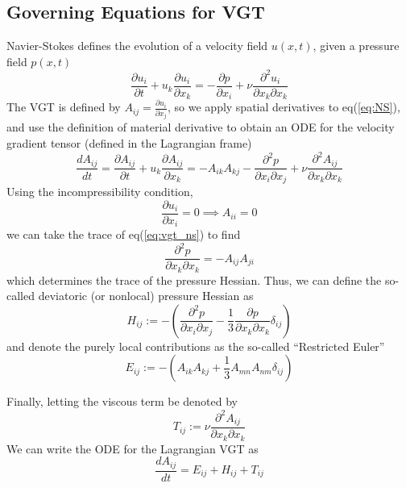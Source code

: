 \subsection{Governing Equations for VGT}
Navier-Stokes defines the evolution of a velocity field $u(x,t)$, given a pressure field $p(x,t)$
    \begin{equation} \label{eq:NS}
      \frac{\partial u_i}{\partial t} + u_k \frac{\partial u_i}{\partial x_k} = -\frac{\partial p}{\partial x_i} + \nu \frac{\partial^2 u_i}{\partial x_k \partial x_k}
    \end{equation}
The VGT is defined by $A_{ij} = \frac{\partial u_i}{\partial x_j}$, so we apply spatial derivatives to eq(\ref{eq:NS}), and use the definition of material derivative to obtain an ODE for the velocity gradient tensor (defined in the Lagrangian frame)
\begin{equation}
  \frac{dA_{ij}}{dt} = \frac{\partial A_{ij}}{\partial t} + u_k \frac{\partial A_{ij}}{\partial x_k} = - A_{ik}A_{kj} - \frac{\partial^2 p}{\partial x_i \partial x_j} + \nu \frac{\partial^2 A_{ij}}{\partial x_k \partial x_k} \label{eq:vgt_ns}
\end{equation}
Using the incompressibility condition,
\begin{equation}
    \frac{\partial u_i}{\partial x_i} = 0 \implies A_{ii} = 0
\end{equation}
we can take the trace of eq(\ref{eq:vgt_ns}) to find
\begin{equation}
 \frac{\partial^2 p}{\partial x_k \partial x_k} = - A_{ij}A_{ji}
\end{equation}
which determines the trace of the pressure Hessian. Thus, we can define the so-called deviatoric (or nonlocal) pressure Hessian as
\begin{equation}
  H_{ij} := - \left( \frac{\partial^2 p}{\partial x_i \partial x_j} - \frac{1}{3}\frac{\partial p}{\partial x_k \partial x_k}\delta_{ij}  \right)
\end{equation}
and denote the purely local contributions as the so-called ``Restricted Euler''
\begin{equation}
    E_{ij} := - \left(A_{ik}A_{kj} + \frac{1}{3}A_{mn}A_{nm}\delta_{ij}\right)
\end{equation}

Finally, letting the viscous term be denoted by
\begin{equation}
    T_{ij} := \nu \frac{\partial^2 A_{ij}}{\partial x_k \partial x_k}
\end{equation}
We can write the ODE for the Lagrangian VGT as
\begin{equation}
    \frac{dA_{ij}}{dt} = E_{ij} + H_{ij} + T_{ij}
\end{equation}

